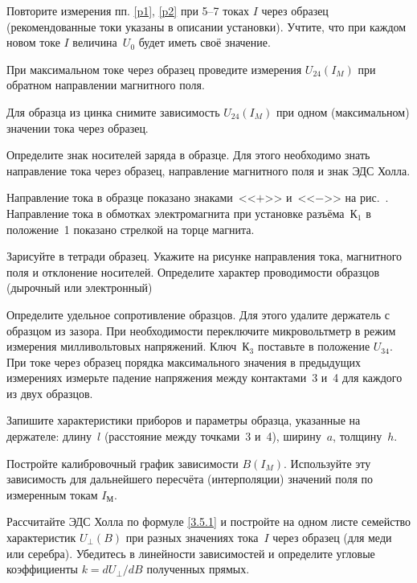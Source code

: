 \begin{lab:task}
\item Повторите измерения пп. \ref{p1}, \ref{p2} при 5--7 токах $I$ через образец
(рекомендованные токи указаны в описании установки).  
Учтите, что при каждом новом токе $I$ величина~$U_0$ будет иметь 
своё значение.

\item При максимальном токе через образец проведите измерения $U_{24}(I_{M})$ 
при обратном направлении магнитного поля.

\item Для образца из цинка снимите зависимость $U_{24}(I_{M})$ при одном 
(максимальном) значении тока через образец.

\item Определите знак носителей заряда в образце. Для этого необходимо знать
направление тока через образец, направление магнитного поля и знак ЭДС Холла.

Направление тока в образце показано знаками~<<$+$>> и~<<$-$>> на
рис.~. Направление тока в обмотках электромагнита при 
установке разъёма~К$_1$ в положение~1 показано стрелкой на торце магнита.

Зарисуйте в тетради образец. Укажите на рисунке направления тока, магнитного
поля и отклонение носителей. Определите характер проводимости образцов
(дырочный или электронный)

\item Определите удельное сопротивление образцов. Для этого удалите держатель с
образцом из зазора. При необходимости переключите микровольтметр 
в режим измерения милливольтовых напряжений. Ключ~К$_3$ поставьте 
в положение $U_{34}$. При токе через образец порядка максимального 
значения в предыдущих измерениях измерьте падение напряжения между 
контактами~3 и~4 для каждого из двух образцов.

\item Запишите характеристики приборов и параметры образца, указанные на держателе:
длину~$l$ (расстояние между точками~3 и~4), ширину~$a$, толщину~$h$.


\item Постройте калибровочный график зависимости $B(I_{M})$. 
Используйте эту зависимость для дальнейшего пересчёта (интерполяции)
значений поля по измеренным токам $I_{М}$.

\item Рассчитайте ЭДС Холла по формуле \eqref{3.5.1} и постройте на одном листе
семейство характеристик $U_{\perp}(B)$ при разных значениях тока~$I$ через
образец (для меди или серебра). 
Убедитесь в линейности зависимостей и определите угловые 
коэффициенты $k=dU_{\perp}/dB$ полученных прямых.


\end{lab:task}
